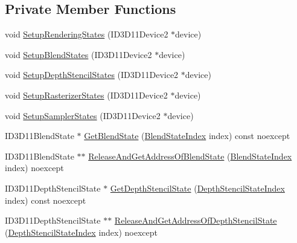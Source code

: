 \subsection*{Private Member Functions}
\begin{DoxyCompactItemize}
\item 
void \hyperlink{classmage_1_1_rendering_state_manager_a3b8a33ee9e8463c414a99ede25ddc804}{Setup\+Rendering\+States} (I\+D3\+D11\+Device2 $\ast$device)
\item 
void \hyperlink{classmage_1_1_rendering_state_manager_aae2555b33425551c6ab9c60b8b08fdb5}{Setup\+Blend\+States} (I\+D3\+D11\+Device2 $\ast$device)
\item 
void \hyperlink{classmage_1_1_rendering_state_manager_a1ed3748a524989095142181b14745e88}{Setup\+Depth\+Stencil\+States} (I\+D3\+D11\+Device2 $\ast$device)
\item 
void \hyperlink{classmage_1_1_rendering_state_manager_a442a2c0fdbde97eddae013836e279e75}{Setup\+Rasterizer\+States} (I\+D3\+D11\+Device2 $\ast$device)
\item 
void \hyperlink{classmage_1_1_rendering_state_manager_a24bbe9cad45338b64979388de4247c57}{Setup\+Sampler\+States} (I\+D3\+D11\+Device2 $\ast$device)
\item 
I\+D3\+D11\+Blend\+State $\ast$ \hyperlink{classmage_1_1_rendering_state_manager_a09dc8e15d98269b1b9c5f9bb71c647b4}{Get\+Blend\+State} (\hyperlink{classmage_1_1_rendering_state_manager_ae8ea18eb352ae4cf9e23b41f10578984}{Blend\+State\+Index} index) const noexcept
\item 
I\+D3\+D11\+Blend\+State $\ast$$\ast$ \hyperlink{classmage_1_1_rendering_state_manager_ad7626daab9a488a34ab50df3768d5bc9}{Release\+And\+Get\+Address\+Of\+Blend\+State} (\hyperlink{classmage_1_1_rendering_state_manager_ae8ea18eb352ae4cf9e23b41f10578984}{Blend\+State\+Index} index) noexcept
\item 
I\+D3\+D11\+Depth\+Stencil\+State $\ast$ \hyperlink{classmage_1_1_rendering_state_manager_aabd3a4bec099f0325c238bdfa43cbc88}{Get\+Depth\+Stencil\+State} (\hyperlink{classmage_1_1_rendering_state_manager_abcfd0e984d2ba2710320882430d6871a}{Depth\+Stencil\+State\+Index} index) const noexcept
\item 
I\+D3\+D11\+Depth\+Stencil\+State $\ast$$\ast$ \hyperlink{classmage_1_1_rendering_state_manager_a2387df8ca417a4e743551e9a59af19de}{Release\+And\+Get\+Address\+Of\+Depth\+Stencil\+State} (\hyperlink{classmage_1_1_rendering_state_manager_abcfd0e984d2ba2710320882430d6871a}{Depth\+Stencil\+State\+Index} index) noexcept
\item 

\end{DoxyCompactItemize}
